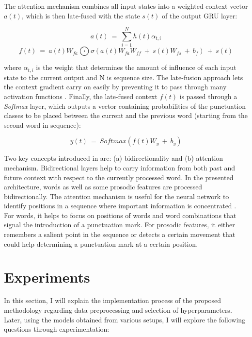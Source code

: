 The attention mechanism combines all input states into a weighted context vector $a(t)$, which is then late-fused with the state $s(t)$ of the output GRU layer:

\begin{equation}
a(t)~=~\sum_{i=1}^{N} h(t) \alpha_{t,i}
\end{equation}
\begin{equation}
f(t)~=~a(t)W_{fa}\bigodot\sigma(a(t)W_{fa}W_{ff}~+~s(t)W_{fs}~+~b_{f})~+~s(t) 
\end{equation}

\noindent where $\alpha_{t,i}$ is the weight that determines the amount of influence of each input state to the current output and N is sequence size. The late-fusion approach lets the context gradient carry on easily by preventing it to pass through many activation functions \citep{fusion}. Finally, the late-fused context $f(t)$ is passed through a \textit{Softmax} layer, which outputs a vector containing probabilities of the punctuation classes to be placed between the current and the previous word (starting from the second word in sequence): 

\begin{equation}
y(t)~=~Softmax(f(t)W_{y}~+~b_{y})
\end{equation}

Two key concepts introduced in \cite{tilk2016bidirectional} are: (a) bidirectionality and (b) attention mechanism. Bidirectional layers help to carry information from both past and future context with respect to the currently processed word. In the presented architecture, words as well as some prosodic features are processed bidirectionally. The attention mechanism is useful for the neural network to identify positions in a sequence where important information is concentrated \citep{bahdanau}. For words, it helps to focus on positions of words and word combinations that signal the introduction of a punctuation mark. For prosodic features, it either remembers a salient point in the sequence or detects a certain movement that could help determining a punctuation mark at a certain position. 

\section{Experiments}
\label{punkProse:experiments}

In this section, I will explain the implementation process of the proposed methodology regarding data preprocessing and selection of hyperparameters. Later, using the models obtained from various setups, I will explore the following questions through experimentation: 

